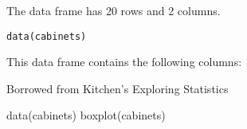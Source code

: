 \begin{Description}\relax
The  data frame has 20 rows and 2 columns.
\end{Description}
\begin{Usage}
\begin{verbatim}data(cabinets)\end{verbatim}
\end{Usage}
\begin{Format}\relax
This data frame contains the following columns:
\end{Format}
\begin{Source}\relax
Borrowed from Kitchen's Exploring Statistics
\end{Source}
\begin{Examples}
\begin{ExampleCode}
data(cabinets)
boxplot(cabinets)
\end{ExampleCode}
\end{Examples}

